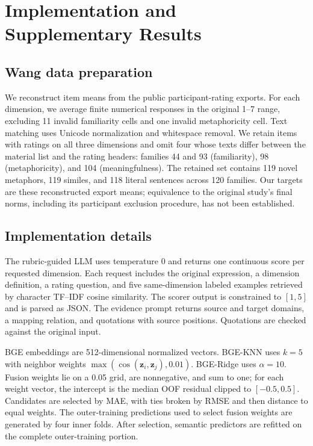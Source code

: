 \section{Implementation and Supplementary Results}

\subsection{Wang data preparation}
\label{sec:wang_data}

We reconstruct item means from the public participant-rating exports. For each dimension, we average finite numerical responses in the original 1--7 range, excluding 11 invalid familiarity cells and one invalid metaphoricity cell. Text matching uses Unicode normalization and whitespace removal. We retain items with ratings on all three dimensions and omit four whose texts differ between the material list and the rating headers: families 44 and 93 (familiarity), 98 (metaphoricity), and 104 (meaningfulness). The retained set contains 119 novel metaphors, 119 similes, and 118 literal sentences across 120 families. Our targets are these reconstructed export means; equivalence to the original study's final norms, including its participant exclusion procedure, has not been established.

\subsection{Implementation details}

The rubric-guided LLM uses temperature 0 and returns one continuous score per requested dimension. Each request includes the original expression, a dimension definition, a rating question, and five same-dimension labeled examples retrieved by character TF--IDF cosine similarity. The scorer output is constrained to $[1,5]$ and is parsed as JSON. The evidence prompt returns source and target domains, a mapping relation, and quotations with source positions. Quotations are checked against the original input.

BGE embeddings are 512-dimensional normalized vectors. BGE-KNN uses $k=5$ with neighbor weights $\max(\cos(\mathbf{z}_i,\mathbf{z}_j),0.01)$. BGE-Ridge uses $\alpha=10$. Fusion weights lie on a 0.05 grid, are nonnegative, and sum to one; for each weight vector, the intercept is the median OOF residual clipped to $[-0.5,0.5]$. Candidates are selected by MAE, with ties broken by RMSE and then distance to equal weights. The outer-training predictions used to select fusion weights are generated by four inner folds. After selection, semantic predictors are refitted on the complete outer-training portion.

